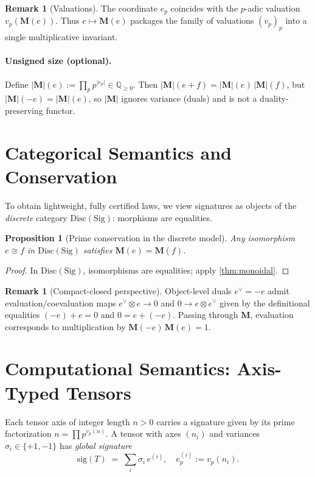 \documentclass[11pt]{article}
\theoremstyle{plain}
\newtheorem{proposition}[theorem]{Proposition}
\theoremstyle{definition}
\newtheorem{remark}[theorem]{Remark}
\newcommand{\Q}{\mathbb{Q}}
\newcommand{\Sig}{\mathrm{Sig}}
\newcommand{\D}{\mathrm{Disc}} %
\newcommand{\M}{\mathbf{M}} %
\newcommand{\Mabs}{\lvert\mathbf{M}\rvert}
\begin{document}
\begin{remark}[Valuations]
The coordinate $e_p$ coincides with the $p$-adic valuation $v_p(\M(e))$. Thus $e\mapsto \M(e)$ packages the family of valuations $(v_p)_p$ into a single multiplicative invariant.
\end{remark}

\paragraph{Unsigned size (optional).} Define $\Mabs(e):=\prod_p p^{\lvert e_p\rvert}\in \Q_{\ge 0}$. Then $\Mabs(e+f)=\Mabs(e)\,\Mabs(f)$, but $\Mabs(-e)=\Mabs(e)$, so $\Mabs$ ignores variance (duals) and is not a duality-preserving functor.

\section{Categorical Semantics and Conservation}
\label{sec:category}
To obtain lightweight, fully certified laws, we view signatures as objects of the \emph{discrete} category $\D(\Sig)$: morphisms are equalities.

\begin{proposition}[Prime conservation in the discrete model]
Any isomorphism $e\cong f$ in $\D(\Sig)$ satisfies $\M(e)=\M(f)$.
\end{proposition}
\begin{proof}
In $\D(\Sig)$, isomorphisms are equalities; apply \cref{thm:monoidal}.
\end{proof}

\begin{remark}[Compact-closed perspective]
Object-level duals $e^\vee=-e$ admit evaluation/coevaluation maps $e^\vee\otimes e\to 0$ and $0\to e\otimes e^\vee$ given by the definitional equalities $(-e)+e=0$ and $0=e+(-e)$. Passing through $\M$, evaluation corresponds to multiplication by $\M(-e)\,\M(e)=1$.
\end{remark}

\section{Computational Semantics: Axis-Typed Tensors}
\label{sec:computational}
Each tensor axis of integer length $n>0$ carries a signature given by its prime factorization $n=\prod p^{v_p(n)}$. A tensor with axes $(n_i)$ and variances $\sigma_i\in\{+1,-1\}$ has \emph{global signature}
\[
  \mathrm{sig}(T)\;=\;\sum_i \sigma_i\, e^{(i)},\quad e^{(i)}_p:=v_p(n_i).
\]
\end{document}
